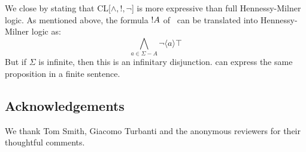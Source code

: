 We close by stating that CL[$\land, !, \neg$] is more expressive than
full Hennessy-Milner logic. As mentioned above, the formula $! A$ of
\cathoristic\ can be translated into Hennessy-Milner logic as:
\[
\bigwedge_{a \in \Sigma - A} \neg \langle a \rangle \top
\]
But if $\Sigma$ is infinite, then this is an infinitary disjunction.
\Cathoristic{} can express the same proposition in a finite sentence.


\subsection{Acknowledgements}
We thank Tom Smith, Giacomo Turbanti and the anonymous reviewers for
their thoughtful comments.
